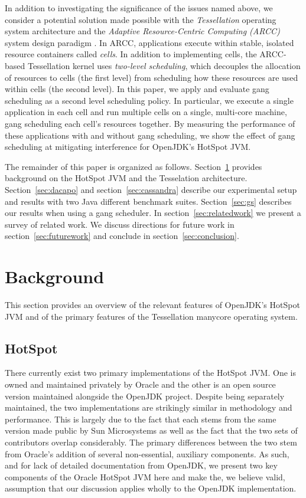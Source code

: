 \documentclass{sig-alternate}
\begin{document}
In addition to investigating the significance of the issues named above, we consider a potential solution made possible with the \textit{Tessellation} operating system architecture and the \textit{Adaptive Resource-Centric Computing (ARCC)} system design paradigm \cite{colmenares2010resource, colmenares2013tessellation, liu2009tessellation}. In ARCC, applications execute within stable, isolated resource containers called \textit{cells}. In addition to implementing cells, the ARCC-based Tessellation kernel uses \textit{two-level scheduling}, which decouples the allocation of resources to cells (the first level) from scheduling how these resources are used within cells (the second level). In this paper, we apply and evaluate gang scheduling \cite{feitelson1992gang} as a second level scheduling policy. In particular, we execute a single application in each cell and run multiple cells on a single, multi-core machine, gang scheduling each cell's resources together. By measuring the performance of these applications with and without gang scheduling, we show the effect of gang scheduling at mitigating interference for OpenJDK's HotSpot JVM.

The remainder of this paper is organized as follows. Section~\ref{sec:background} provides background on the HotSpot JVM and the Tesselation architecture. Section~\ref{sec:dacapo} and section~\ref{sec:cassandra} describe our experimental setup and results with two Java different benchmark suites. Section~\ref{sec:gs} describes our results when using a gang scheduler. In section~\ref{sec:relatedwork} we present a survey of related work. We discuss directions for future work in section~\ref{sec:futurework} and conclude in section~\ref{sec:conclusion}.

\section{Background} \label{sec:background}
This section provides an overview of the relevant features of OpenJDK's HotSpot JVM and of the primary features of the Tessellation manycore operating system.

\subsection{HotSpot}
There currently exist two primary implementations of the HotSpot JVM. One is owned and maintained privately by Oracle and the other is an open source version maintained alongside the OpenJDK project. Despite being separately maintained, the two implementations are strikingly similar in methodology and performance. This is largely due to the fact that each stems from the same version made public by Sun Microsystems as well as the fact that the two sets of contributors overlap considerably. The primary differences between the two stem from Oracle's addition of several non-essential, auxiliary components. As such, and for lack of detailed documentation from OpenJDK, we present two key components of the Oracle HotSpot JVM here and make the, we believe valid, assumption that our discussion applies wholly to the OpenJDK implementation.
\end{document}
